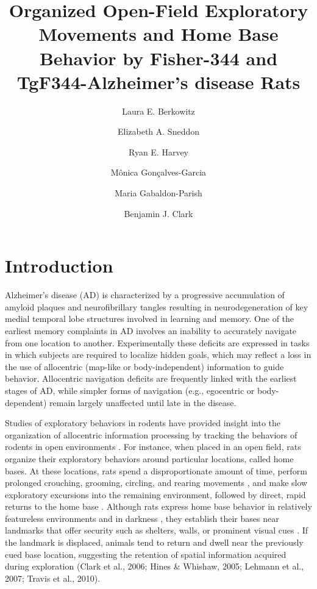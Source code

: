 \documentclass[fleqn,10pt]{wlscirep}
\title{Organized Open-Field Exploratory Movements and Home Base Behavior by Fisher-344 and TgF344-Alzheimer’s disease Rats}
\author[1]{Laura E. Berkowitz}
\author[1]{Elizabeth A. Sneddon}
\author[1]{Ryan E. Harvey}
\author[1]{M\^{o}nica Gon\c{c}alves-Garcia}
\author[1]{Maria Gabaldon-Parish}
\author[1,*]{Benjamin J. Clark}
\affil[1]{University of New Mexico, Psychology, Albuquerque, NM 87131, United States}
\affil[*]{bnjclark@unm.edu}
\begin{document}
\flushbottom
\maketitle
%
%
\thispagestyle{empty}

\section*{Introduction}

Alzheimer’s disease (AD) is characterized by a progressive accumulation of amyloid plaques and neurofibrillary tangles resulting in neurodegeneration of key medial temporal lobe structures involved in learning and memory. One of the earliest memory complaints in AD involves an inability to accurately navigate from one location to another. Experimentally these deficits are expressed in tasks in which subjects are required to localize hidden goals, which may reflect a loss in the use of allocentric (map-like or body-independent) information to guide behavior. Allocentric navigation deficits are frequently linked with the earliest stages of AD, while simpler forms of navigation (e.g., egocentric or body-dependent) remain largely unaffected until late in the disease.

Studies of exploratory behaviors in rodents have provided insight into the organization of allocentric information processing by tracking the behaviors of rodents in open environments \cite{dudchenko_neuroethology_2018,poulter_neurobiology_2018,thompson_behavioral_2018}. For instance, when placed in an open field, rats organize their exploratory behaviors around particular locations, called home bases. At these locations, rats spend a disproportionate amount of time, perform prolonged crouching, grooming, circling, and rearing movements \cite{eilam_home_1989}, and make slow exploratory excursions into the remaining environment, followed by direct, rapid returns to the home base \cite{wallace_nmda_2003}. Although rats express home base behavior in relatively featureless environments and in darkness \cite{eilam_home_1989,hines_home_2005,nemati_point_2007}, they establish their bases near landmarks that offer security such as shelters, walls, or prominent visual cues \cite{clark_impaired_2005,hines_home_2005,lehmann_complete_2007,wallace_nmda_2003,whishaw_exploratory_2006}. If the landmark is displaced, animals tend to return and dwell near the previously cued base location, suggesting the retention of spatial information acquired during exploration \cite{clark_impaired_2005,hines_home_2005,lehmann_complete_2007}(Clark et al., 2006; Hines \& Whishaw, 2005; Lehmann et al., 2007; Travis et al., 2010). 
\end{document}
